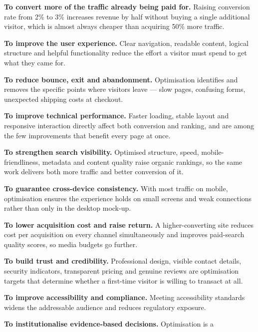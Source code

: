 \begin{qlist}
\begin{apts}
\item \textbf{To convert more of the traffic already being paid for.} Raising
      conversion rate from 2\% to 3\% increases revenue by half without buying
      a single additional visitor, which is almost always cheaper than
      acquiring 50\% more traffic.
\item \textbf{To improve the user experience.} Clear navigation, readable
      content, logical structure and helpful functionality reduce the effort a
      visitor must spend to get what they came for.
\item \textbf{To reduce bounce, exit and abandonment.} Optimisation identifies
      and removes the specific points where visitors leave --- slow pages,
      confusing forms, unexpected shipping costs at checkout.
\item \textbf{To improve technical performance.} Faster loading, stable layout
      and responsive interaction directly affect both conversion and ranking,
      and are among the few improvements that benefit every page at once.
\item \textbf{To strengthen search visibility.} Optimised structure, speed,
      mobile-friendliness, metadata and content quality raise organic rankings,
      so the same work delivers both more traffic and better conversion of it.
\item \textbf{To guarantee cross-device consistency.} With most traffic on
      mobile, optimisation ensures the experience holds on small screens and
      weak connections rather than only in the desktop mock-up.
\item \textbf{To lower acquisition cost and raise return.} A higher-converting
      site reduces cost per acquisition on every channel simultaneously and
      improves paid-search quality scores, so media budgets go further.
\item \textbf{To build trust and credibility.} Professional design, visible
      contact details, security indicators, transparent pricing and genuine
      reviews are optimisation targets that determine whether a first-time
      visitor is willing to transact at all.
\item \textbf{To improve accessibility and compliance.} Meeting accessibility
      standards widens the addressable audience and reduces regulatory
      exposure.
\item \textbf{To institutionalise evidence-based decisions.} Optimisation is a

\end{apts}
\end{qlist}
